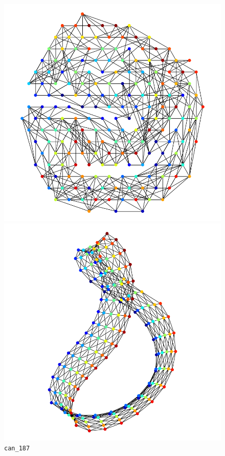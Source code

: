 \documentclass[dvipdfmx,journal]{IEEEtran}
\begin{document}
\begin{figure}[t]
    \centering
    \begin{minipage}{0.49\columnwidth}
        \centering
        \includegraphics[width=0.5\columnwidth]{overall/viz/can_187_SN_FR_first.png}
    \end{minipage}
    \begin{minipage}{0.49\columnwidth}
        \centering
        \includegraphics[width=0.5\columnwidth]{overall/viz/can_187_SN_FR_last.png}
    \end{minipage}
    \caption{\texttt{can\_187}}
    \label{fig:can_187}
\end{figure}
\end{document}

